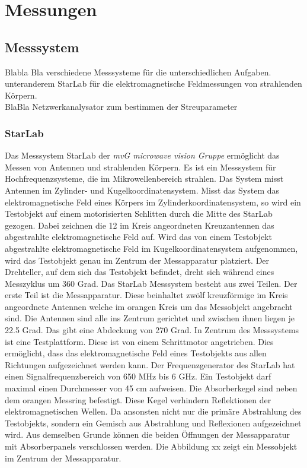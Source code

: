 \newpage
\chapter{Messungen}
\section{Messsystem}
Blabla Bla verschiedene Messsysteme für die unterschiedlichen Aufgaben.\\
unteranderem  StarLab für die elektromagnetische Feldmessungen von strahlenden Körpern.\\

BlaBla Netzwerkanalysator zum bestimmen der Streuparameter
\subsection{StarLab}
Das Messsystem  StarLab der \textit{mvG microwave vision Gruppe} ermöglicht das Messen von Antennen und strahlenden Körpern. Es ist ein Messsystem für Hochfrequenzsysteme, die im Mikrowellenbereich strahlen. Das System misst Antennen im Zylinder- und Kugelkoordinatensystem. Misst das System das elektromagnetische Feld eines Körpers im Zylinderkoordinatensystem, so wird ein Testobjekt auf einem motorisierten Schlitten durch die Mitte des StarLab gezogen. Dabei zeichnen die 12 im Kreis angeordneten Kreuzantennen das abgestrahlte elektromagnetische Feld auf. 
Wird das von einem Testobjekt abgestrahlte elektromagnetische Feld im Kugelkoordinatensystem aufgenommen, wird das Testobjekt genau im Zentrum der Messapparatur platziert. Der Drehteller, auf dem sich das Testobjekt befindet, dreht sich während eines Messzyklus um 360 Grad. 
Das StarLab Messsystem besteht aus  zwei Teilen. Der erste Teil ist die Messapparatur. Diese beinhaltet zwölf kreuzförmige im Kreis angeordnete Antennen welche im orangen Kreis um das Messobjekt angebracht sind.  Die Antennen sind alle ins Zentrum gerichtet und zwischen ihnen liegen je 22.5 Grad. Das gibt eine Abdeckung von 270 Grad. In Zentrum des Messsystems ist eine Testplattform. Diese ist von einem Schrittmotor angetrieben. Dies ermöglicht, dass das elektromagnetische Feld eines Testobjekts aus allen Richtungen aufgezeichnet werden kann. Der Frequenzgenerator des StarLab hat einen Signalfrequenzbereich von 650 MHz bis 6 GHz. Ein Testobjekt darf maximal einen Durchmesser von 45 cm aufweisen.
Die Absorberkegel sind neben dem orangen Messring befestigt. Diese Kegel verhindern Reflektionen der elektromagnetischen Wellen. Da ansonsten nicht nur die primäre Abstrahlung des Testobjekts, sondern ein Gemisch aus Abstrahlung und Reflexionen aufgezeichnet wird. Aus demselben Grunde können die beiden Öffnungen der Messapparatur mit Absorberpanels verschlossen werden. Die Abbildung xx zeigt ein Messobjekt im Zentrum der Messapparatur. 

